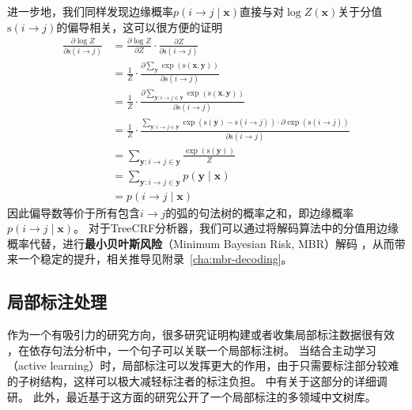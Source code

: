 进一步地，我们同样发现边缘概率$p(i \rightarrow j\mid\boldsymbol{x})$直接与对$\log Z(\boldsymbol{x})$关于分值$\mathrm{s}(i\rightarrow j)$的偏导相关，这可以很方便的证明
\begin{equation}
	\label{eq:dep-partial-derivative}
	\begin{split}
		\frac{\partial \log Z}{\partial \mathrm{s}(i\rightarrow j)}
		& = \frac{\partial \log Z}{\partial Z} \cdot \frac{\partial Z}{\partial \mathrm{s}(i\rightarrow j)}\\
		& =\frac{1}{Z} \cdot \frac{\partial \sum_{\boldsymbol{y}} \exp \left(\mathrm{s}(\boldsymbol{x}, \boldsymbol{y}) \right)}{\partial \mathrm{s}(i\rightarrow j)}\\
		& =\frac{1}{Z} \cdot \frac{\partial \sum_{\boldsymbol{y}:i\rightarrow j \in \boldsymbol{{y}}} \exp \left(\mathrm{s}(\boldsymbol{x}, \boldsymbol{y}) \right)}{\partial \mathrm{s}(i\rightarrow j)}\\
		& =\frac{1}{Z} \cdot \frac{\sum_{\boldsymbol{y}:i\rightarrow j \in \boldsymbol{{y}}} \exp \left( \mathrm{s}(\boldsymbol{y}) -\mathrm{s}(i\rightarrow j)  \right)\cdot \partial \exp(\mathrm{s}(i\rightarrow j))}{\partial \mathrm{s}(i\rightarrow j)}\\
		& =\sum_{\boldsymbol{y}:i\rightarrow j \in \boldsymbol{{y}}} \frac{\exp \left( \mathrm{s}(\boldsymbol{y})\right)}{Z}\\
		&= \sum_{\boldsymbol{y}:i\rightarrow j \in \boldsymbol{{y}}} p(\boldsymbol{y}\mid\boldsymbol{x})\\
		&= p(i \rightarrow j\mid\boldsymbol{x})
	\end{split}
\end{equation}
因此偏导数等价于所有包含$i \rightarrow j$的弧的句法树的概率之和，即边缘概率$p(i \rightarrow j\mid\boldsymbol{x})$。
对于TreeCRF分析器，我们可以通过将解码算法中的分值用边缘概率代替，进行\textbf{最小贝叶斯风险}（Minimum Bayesian Risk, MBR）解码 \citep{smith-smith-2007-probabilistic}，从而带来一个稳定的提升，相关推导见附录~\ref{cha:mbr-decoding}。

\subsection{局部标注处理}
\label{sub@sec:partial-annotation}

作为一个有吸引力的研究方向，很多研究证明构建或者收集局部标注数据很有效 \citep{nivre-etal-2014-squibs,hwa-1999-supervised,pereira-schabes-1992-inside-outside}，在依存句法分析中，一个句子可以关联一个局部标注树。
当结合主动学习（active learning）时，局部标注可以发挥更大的作用，由于只需要标注部分较难的子树结构，这样可以极大减轻标注者的标注负担。
\citet{li-etal-2016-active}中有关于这部分的详细调研。
此外，\citet{peng-etal-2019-overview}最近基于这方面的研究公开了一个局部标注的多领域中文树库。

